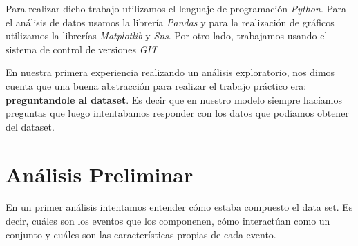 \documentclass[titlepage,a4paper]{article}
\begin{document}
	Para realizar dicho trabajo utilizamos el lenguaje de programación \textit{Python}. Para el análisis de datos usamos la librería \textit{Pandas} y para la realización de gráficos utilizamos la librerías \textit{Matplotlib }y \textit{Sns}. Por otro lado, trabajamos usando el sistema de control de versiones \textit{GIT}	
	
	En nuestra primera experiencia realizando un análisis exploratorio, nos dimos cuenta que una buena abstracción para realizar el trabajo práctico era: \textbf{preguntandole al dataset}. Es decir que en nuestro modelo siempre hacíamos preguntas que luego intentabamos responder con los datos que podíamos obtener del dataset. 
	
	\section{Análisis Preliminar}
	En un primer análisis intentamos entender cómo estaba compuesto el data set. Es decir, cuáles son los eventos que los componenen, cómo interactúan como un conjunto y cuáles son las características propias de cada evento. 
\end{document}
